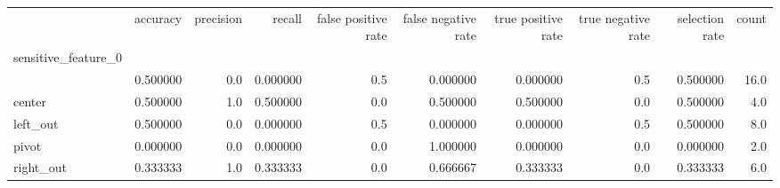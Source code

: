 \begin{tabular}{lrrrrrrrrr}
\toprule
{} &  accuracy &  precision &    recall &  false positive rate &  false negative rate &  true positive rate &  true negative rate &  selection rate &  count \\
sensitive\_feature\_0 &           &            &           &                      &                      &                     &                     &                 &        \\
\midrule
                    &  0.500000 &        0.0 &  0.000000 &                  0.5 &             0.000000 &            0.000000 &                 0.5 &        0.500000 &   16.0 \\
center              &  0.500000 &        1.0 &  0.500000 &                  0.0 &             0.500000 &            0.500000 &                 0.0 &        0.500000 &    4.0 \\
left\_out            &  0.500000 &        0.0 &  0.000000 &                  0.5 &             0.000000 &            0.000000 &                 0.5 &        0.500000 &    8.0 \\
pivot               &  0.000000 &        0.0 &  0.000000 &                  0.0 &             1.000000 &            0.000000 &                 0.0 &        0.000000 &    2.0 \\
right\_out           &  0.333333 &        1.0 &  0.333333 &                  0.0 &             0.666667 &            0.333333 &                 0.0 &        0.333333 &    6.0 \\
\bottomrule
\end{tabular}
